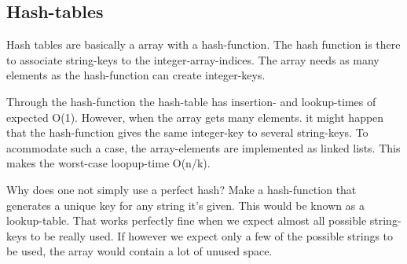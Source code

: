 \subsection{Hash-tables}

Hash tables are basically a array with a hash-function. The hash function is there to associate string-keys to the integer-array-indices. The array needs as many elements as the hash-function can create integer-keys. 

Through the hash-function the hash-table has insertion- and lookup-times of expected O(1). However, when the array gets many elements. it might happen that the hash-function gives the same integer-key to several string-keys. To acommodate such a case, the array-elements are implemented as linked lists. This makes the worst-case loopup-time O(n/k).


Why does one not simply use a perfect hash? Make a hash-function that generates a unique key for any string it's given. This would be known as a lookup-table. That works perfectly fine when we expect almost all possible string-keys to be really used. If however we  expect only a few of the possible strings to be used, the array would contain a lot of unused space.